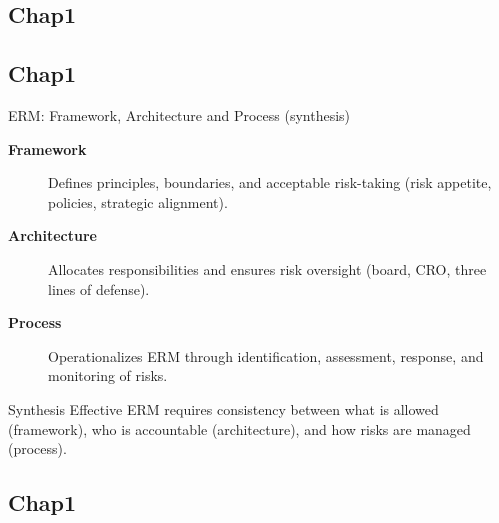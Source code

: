 \documentclass[aspectratio=169, 10pt]{beamer} %
\begin{document}
\subsection{Chap1}
\subsection{Chap1}
\begin{frame}{ERM: Framework, Architecture and Process (synthesis)}

\begin{description}
    \item[\textbf{Framework}] Defines principles, boundaries, and acceptable
    risk-taking (risk appetite, policies, strategic alignment).

    \item[\textbf{Architecture}] Allocates responsibilities and ensures risk
    oversight (board, CRO, three lines of defense).

    \item[\textbf{Process}] Operationalizes ERM through identification,
    assessment, response, and monitoring of risks.
\end{description}

\begin{block}{Synthesis}
Effective ERM requires consistency between what is allowed
(framework), who is accountable (architecture), and how risks are
managed (process).
\end{block}
\medskip

 \href{https://github.com/fsananou/bsb-erm/blob/main/_exercice_and_cases.pdf}{}

\end{frame}

\subsection{Chap1}
\end{document}
